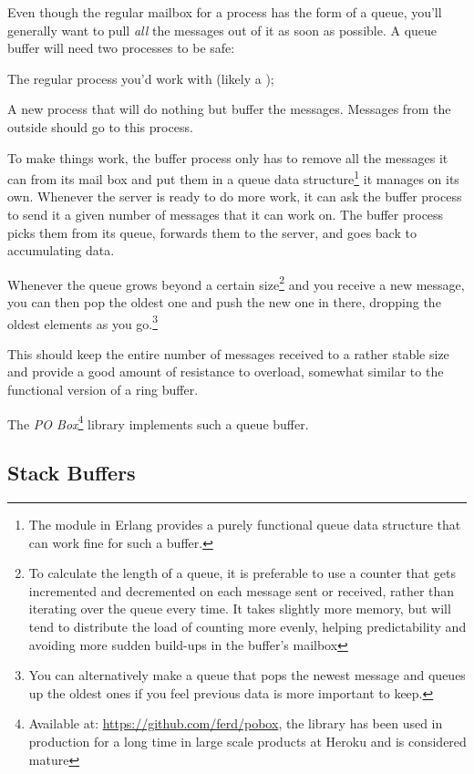 Even though the regular mailbox for a process has the form of a queue, you'll generally want to pull \emph{all} the messages out of it as soon as possible. A queue buffer will need two processes to be safe:

\begin{itemize*}
	\item The regular process you'd work with (likely a );
	\item A new process that will do nothing but buffer the messages. Messages from the outside should go to this process.
\end{itemize*}

To make things work, the buffer process only has to remove all the messages it can from its mail box and put them in a queue data structure\footnote{The  module in Erlang provides a purely functional queue data structure that can work fine for such a buffer.} it manages on its own. Whenever the server is ready to do more work, it can ask the buffer process to send it a given number of messages that it can work on. The buffer process picks them from its queue, forwards them to the server, and goes back to accumulating data.

Whenever the queue grows beyond a certain size\footnote{To calculate the length of a queue, it is preferable to use a counter that gets incremented and decremented on each message sent or received, rather than iterating over the queue every time. It takes slightly more memory, but will tend to distribute the load of counting more evenly, helping predictability and avoiding more sudden build-ups in the buffer's mailbox} and you receive a new message, you can then pop the oldest one and push the new one in there, dropping the oldest elements as you go.\footnote{You can alternatively make a queue that pops the newest message and queues up the oldest ones if you feel previous data is more important to keep.}

This should keep the entire number of messages received to a rather stable size and provide a good amount of resistance to overload, somewhat similar to the functional version of a ring buffer.

The \emph{PO Box}\footnote{Available at: \href{https://github.com/ferd/pobox}{https://github.com/ferd/pobox}, the library has been used in production for a long time in large scale products at Heroku and is considered mature} library implements such a queue buffer.

\subsection{Stack Buffers}

